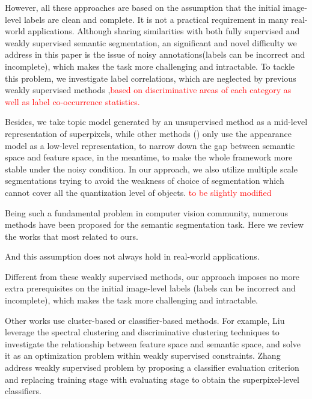 However, all these approaches are based on the assumption that the initial image-level labels are clean and complete. It is not a practical requirement in many real-world applications. Although sharing similarities with both fully supervised and weakly supervised semantic segmentation, an significant and novel difficulty we address in this paper is the issue of noisy annotations(\eg labels can be incorrect and incomplete), which makes the task more challenging and intractable. To tackle this problem, we investigate label correlations, which are neglected by previous weakly supervised methods \cite{verbeek2007region,vezhnevets2010towards,vezhnevets2011weakly,vezhnevets2012weakly,xu2014tell},{\textcolor{red}{based on discriminative areas of each category as well as label co-occurrence statistics.}}

Besides, we take topic model generated by an unsupervised method as a mid-level representation of superpixels, while other methods (\eg \cite{vezhnevets2011weakly,xu2014tell}) only use the appearance model as a low-level representation, to narrow down the gap between semantic space and feature space, in the meantime, to make the whole framework more stable under the noisy condition. In our approach, we also utilize multiple scale segmentations trying to avoid the weakness of choice of segmentation which cannot cover all the quantization level of objects. {\textcolor{red}{to be slightly modified}}

\if
Being such a fundamental problem in computer vision community, numerous methods have been proposed for the semantic segmentation task. Here we review the works that most related to ours.

And this assumption does not always hold in real-world applications.

Different from these weakly supervised methods, our approach imposes no more extra prerequisites on the initial image-level labels (\eg labels can be incorrect and incomplete), which makes the task more challenging and intractable.

Other works use cluster-based or classifier-based methods. For example, Liu \etal \cite{liu2013weakly} leverage the spectral clustering and discriminative clustering techniques to investigate the relationship between feature space and semantic space, and solve it as an optimization problem within weakly supervised constraints. Zhang \etal \cite{zhang2013sparse} address weakly supervised problem by proposing a classifier evaluation criterion and replacing training stage with evaluating stage to obtain the superpixel-level classifiers.
\fi
